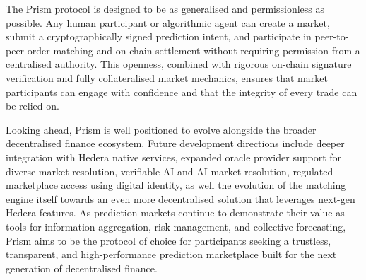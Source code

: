 \documentclass[11pt,a4paper]{article}
\begin{document}
The Prism protocol is designed to be as generalised and permissionless as possible. Any human participant or algorithmic agent can create a market, submit a cryptographically signed prediction intent, and participate in peer-to-peer order matching and on-chain settlement without requiring permission from a centralised authority. This openness, combined with rigorous on-chain signature verification and fully collateralised market mechanics, ensures that market participants can engage with confidence and that the integrity of every trade can be relied on.

Looking ahead, Prism is well positioned to evolve alongside the broader decentralised finance ecosystem. Future development directions include deeper integration with Hedera native services, expanded oracle provider support for diverse market resolution, verifiable AI and AI market resolution, regulated marketplace access using digital identity, as well the evolution of the matching engine itself towards an even more decentralised solution that leverages next-gen Hedera features. As prediction markets continue to demonstrate their value as tools for information aggregation, risk management, and collective forecasting, Prism aims to be the protocol of choice for participants seeking a trustless, transparent, and high-performance prediction marketplace built for the next generation of decentralised finance.






\end{document}

